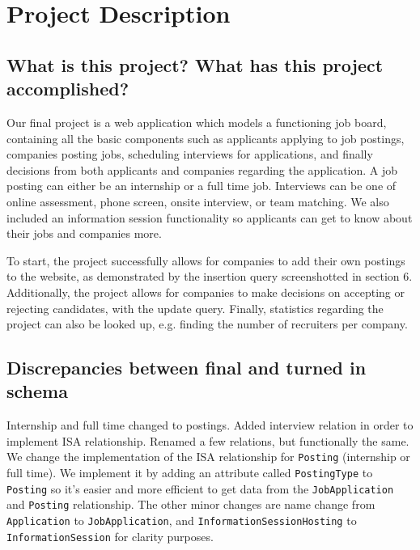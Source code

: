 \section{Project Description}

\subsection{What is this project? What has this project accomplished?}

Our final project is a web application which 
models a functioning job board, 
containing all the basic components
such as applicants applying to job postings, 
companies posting jobs,
scheduling interviews for applications, 
and finally decisions from both applicants and companies regarding the application. 
A job posting can either be an internship or a full time job. 
Interviews can be one of online assessment, phone screen, onsite interview, or team matching. 
We also included an information session functionality so applicants can get to know about their jobs and companies more. 

To start, the project successfully allows for 
companies to add their own postings to the website,
as demonstrated by the insertion query
screenshotted in section 6.
Additionally,
the project allows for companies to make decisions
on accepting or rejecting candidates,
with the update query.
Finally, statistics regarding the project
can also be looked up,
e.g. finding the number of recruiters per company.

\subsection{Discrepancies between final and turned in schema}

Internship and full time changed to postings.
Added interview relation in order to implement ISA relationship.
Renamed a few relations, but functionally the same.
We change the implementation of the ISA relationship for \texttt{Posting} (internship or full time). 
We implement it by adding an attribute called \texttt{PostingType} to \texttt{Posting} 
so it's easier and more efficient to get data from the 
\texttt{JobApplication} and \texttt{Posting} relationship. 
The other minor changes are name change from \texttt{Application} to 
\texttt{JobApplication}, and 
\texttt{InformationSessionHosting} to \texttt{InformationSession} for clarity purposes.
